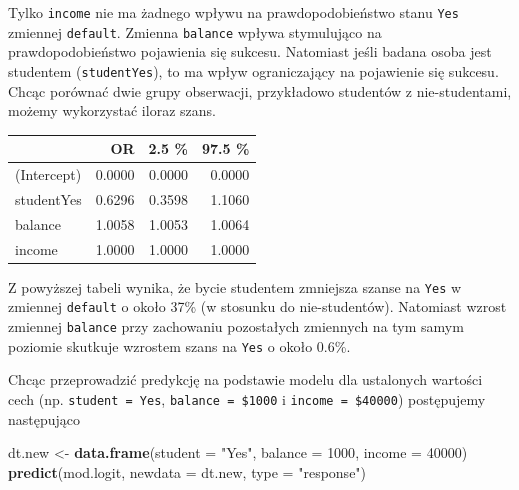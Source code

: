 \documentclass[
]{book}
\newenvironment{Shaded}{\begin{snugshade}}{\end{snugshade}}
\newcommand{\DataTypeTok}[1]{\textcolor[rgb]{0.13,0.29,0.53}{#1}}
\newcommand{\DecValTok}[1]{\textcolor[rgb]{0.00,0.00,0.81}{#1}}
\newcommand{\KeywordTok}[1]{\textcolor[rgb]{0.13,0.29,0.53}{\textbf{#1}}}
\newcommand{\NormalTok}[1]{#1}
\newcommand{\OperatorTok}[1]{\textcolor[rgb]{0.81,0.36,0.00}{\textbf{#1}}}
\newcommand{\StringTok}[1]{\textcolor[rgb]{0.31,0.60,0.02}{#1}}
\theoremstyle{plain}
\theoremstyle{definition}
\theoremstyle{definition}
\theoremstyle{definition}
\theoremstyle{definition}
\theoremstyle{remark}
\begin{document}
Tylko \texttt{income} nie ma żadnego wpływu na prawdopodobieństwo stanu \texttt{Yes} zmiennej \texttt{default}. Zmienna \texttt{balance} wpływa stymulująco na prawdopodobieństwo pojawienia się sukcesu. Natomiast jeśli badana osoba jest studentem (\texttt{studentYes}), to ma wpływ ograniczający na pojawienie się sukcesu. Chcąc porównać dwie grupy obserwacji, przykładowo studentów z nie-studentami, możemy wykorzystać iloraz szans.

\begin{Shaded}
\end{Shaded}

\begin{tabular}{l|r|r|r}
\hline
  & OR & 2.5 \% & 97.5 \%\\
\hline
(Intercept) & 0.0000 & 0.0000 & 0.0000\\
\hline
studentYes & 0.6296 & 0.3598 & 1.1060\\
\hline
balance & 1.0058 & 1.0053 & 1.0064\\
\hline
income & 1.0000 & 1.0000 & 1.0000\\
\hline
\end{tabular}

Z powyższej tabeli wynika, że bycie studentem zmniejsza szanse na \texttt{Yes} w zmiennej \texttt{default} o około 37\% (w stosunku do nie-studentów). Natomiast wzrost zmiennej \texttt{balance} przy zachowaniu pozostałych zmiennych na tym samym poziomie skutkuje wzrostem szans na \texttt{Yes} o około 0.6\%.

Chcąc przeprowadzić predykcję na podstawie modelu dla ustalonych wartości cech (np. \texttt{student\ =\ Yes}, \texttt{balance\ =\ \$1000} i \texttt{income\ =\ \$40000}) postępujemy następująco

\begin{Shaded}
\begin{Highlighting}[]
\NormalTok{dt.new <-}\StringTok{ }\KeywordTok{data.frame}\NormalTok{(}\DataTypeTok{student =} \StringTok{"Yes"}\NormalTok{, }\DataTypeTok{balance =} \DecValTok{1000}\NormalTok{, }\DataTypeTok{income =} \DecValTok{40000}\NormalTok{)}
\KeywordTok{predict}\NormalTok{(mod.logit, }\DataTypeTok{newdata =}\NormalTok{ dt.new, }\DataTypeTok{type =} \StringTok{"response"}\NormalTok{)}
\end{Highlighting}
\end{Shaded}
\end{document}
